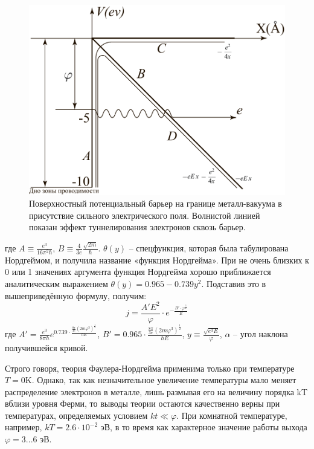 \documentclass[a4paper, 12pt]{article}
\begin{document}
	\begin{figure}
		\centering
		\includegraphics[scale=0.5]{ill.pdf}
		\caption{Поверхностный потенциальный барьер на границе металл-вакуума в присутствие сильного электрического поля. Волнистой линией показан эффект туннелирования электронов сквозь барьер.}
	\end{figure}
	где $A\equiv\frac{e^3}{16\pi^2\hbar}$, $B\equiv\frac{4}{3e}\frac{\sqrt{2m}}{\hbar}$. $\theta(y)$ -- спецфункция, которая была табулирована Нордгеймом, и получила название «функция Нордгейма». При не очень близких к 0 или 1 значениях аргумента функция Нордгейма хорошо приближается аналитическим выражением $\theta(y)=0.965-0.739y^2$. Подставив это в вышеприведённую формулу, получим:
	\begin{equation}
		j=\frac{A'E^2}{\varphi}\cdot e^{-\frac{B'\cdot \varphi^{\frac{3}{2}}}{E}}	\end{equation}
	где $A'=\frac{e^3}{8\pi h}e^{0.739\cdot\frac{\frac{8\pi}{3e}\left(2m\varphi^3\right)^{\frac{1}{2}}}{hE}}$, $B'=0.965\cdot\frac{\frac{8\pi}{3e}\left(2m\varphi^3\right)^{\frac{1}{2}}}{hE}$, $y\equiv\frac{\sqrt{e^3E}}{\varphi}$, $\alpha$ -- угол наклона получившейся кривой.\par
	Строго говоря, теория Фаулера-Нордгейма применима только при температуре $T=0$K. Однако, так как незначительное увеличение температуры мало меняет распределение электронов в металле, лишь размывая его на величину порядка kT вблизи уровня Ферми, то выводы теории остаются качественно верны при температурах, определяемых условием $kt\ll\varphi$. При комнатной температуре, например, $kT=2.6\cdot10^{-2}$ эВ, в то время как характерное значение работы выхода $\varphi=3...6$ эВ.\par
\end{document}
